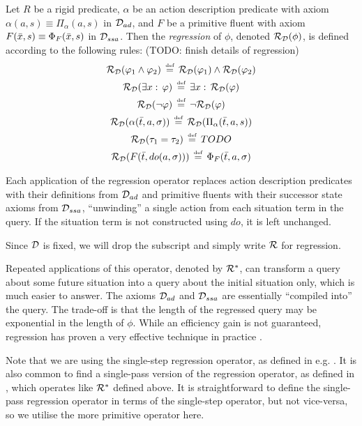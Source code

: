 \begin{defnL}
 Let $R$ be a rigid predicate, $\alpha$
be an action description predicate with axiom $\alpha(a,s)\equiv\Pi_{\alpha}(a,s)$
in $\mathcal{D}_{ad}$, and $F$ be a primitive fluent with axiom $F(\bar{x},s)\equiv\Phi_{F}(\bar{x},s)$
in $\mathcal{D}_{ssa}$. Then the \emph{regression} of $\phi$, denoted $\mathcal{R}_{\mathcal{D}}(\phi)$,
is defined according to the following rules: (TODO: finish details
of regression)\begin{gather*}
\mathcal{R}_{\mathcal{D}}(\varphi_{1}\wedge\varphi_{2})\,\stackrel{\mbox{\tiny def}}{=}\,\mathcal{R}_{\mathcal{D}}(\varphi_{1})\wedge\mathcal{R}_{\mathcal{D}}(\varphi_{2})\\
\mathcal{R}_{\mathcal{D}}(\exists x:\,\varphi)\,\stackrel{\mbox{\tiny def}}{=}\,\exists x:\,\mathcal{R}_{\mathcal{D}}(\varphi)\\
\mathcal{R}_{\mathcal{D}}(\neg\varphi)\,\stackrel{\mbox{\tiny def}}{=}\,\neg\mathcal{R}_{\mathcal{D}}(\varphi)\\
\mathcal{R}_{\mathcal{D}}(\alpha(\bar{t},a,\sigma))\,\stackrel{\mbox{\tiny def}}{=}\,\mathcal{R}_{\mathcal{D}}(\Pi_{\alpha}(\bar{t},a,s))\\
\mathcal{R}_{\mathcal{D}}(\tau_{1}=\tau_{2})\,\stackrel{\mbox{\tiny def}}{=}\, TODO\\
\mathcal{R}_{\mathcal{D}}(F(\bar{t},do(a,\sigma)))\,\stackrel{\mbox{\tiny def}}{=}\,\Phi_{F}(\bar{t},a,\sigma)\end{gather*}

\end{defnL}
Each application of the regression operator replaces action description
predicates with their definitions from $\mathcal{D}_{ad}$ and primitive fluents
with their successor state axioms from $\mathcal{D}_{ssa}$, {}``unwinding''
a single action from each situation term in the query. If the situation
term is not constructed using $do$, it is left unchanged.

Since $\mathcal{D}$ is fixed, we will drop the subscript and simply write
$\mathcal{R}$ for regression.

Repeated applications of this operator, denoted by $\mathcal{R}^{*}$, can
transform a query about some future situation into a query about the
initial situation only, which is much easier to answer. The axioms
$\mathcal{D}_{ad}$ and $\mathcal{D}_{ssa}$ are essentially {}``compiled into''
the query. The trade-off is that the length of the regressed query
may be exponential in the length of $\phi$. While an efficiency gain
is not guaranteed, regression has proven a very effective technique
in practice \citep{levesque97golog,pirri99contributions_sitcalc}.

Note that we are using the single-step regression operator, as defined
in e.g. \citep{scherl03sc_knowledge}. It is also common to find a
single-pass version of the regression operator, as defined in \citep{pirri99contributions_sitcalc},
which operates like $\mathcal{R}^{*}$ defined above. It is straightforward
to define the single-pass regression operator in terms of the single-step
operator, but not vice-versa, so we utilise the more primitive operator
here.

